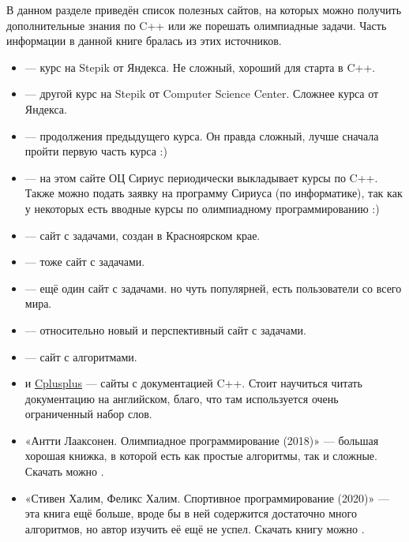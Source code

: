 \hypertarget{0.5}{}
В данном разделе приведён список полезных сайтов, на которых можно получить дополнительные знания по C++ или же порешать олимпиадные задачи. Часть информации в данной книге бралась из этих источников.

\begin{itemize}
    \item {} — курс на Stepik от Яндекса. Не сложный, хороший для старта в C++.
    \item {} — другой курс на Stepik от Computer Science Center. Сложнее курса от Яндекса.
    \item {} — продолжения предыдущего курса. Он правда сложный, лучше сначала пройти первую часть курса :)
    \item {} — на этом сайте ОЦ Сириус периодически выкладывает курсы по C++. Также можно подать заявку на программу Сириуса (по информатике), так как у некоторых есть вводные курсы по олимпиадному программированию :)
    \item {} — сайт с задачами, создан в Красноярском крае.
    \item {} — тоже сайт с задачами.
    \item {} — ещё один сайт с задачами. но чуть популярней, есть пользователи со всего мира.
    \item {} — относительно новый и перспективный сайт с задачами.
    \item {} — сайт с алгоритмами.
    \item {} и \href{https://cplusplus.com/reference/}{Cplusplus} — сайты с документацией C++. Стоит научиться читать документацию на английском, благо, что там используется очень ограниченный набор слов.
    \item «Антти Лааксонен. Олимпиадное программирование (2018)» — большая хорошая книжка, в которой есть как простые алгоритмы, так и сложные. Скачать можно .
    \item «Стивен Халим, Феликс Халим. Спортивное программирование (2020)» — эта книга ещё больше, вроде бы в ней содержится достаточно много алгоритмов, но автор изучить её ещё не успел. Скачать книгу можно .
\end{itemize}
